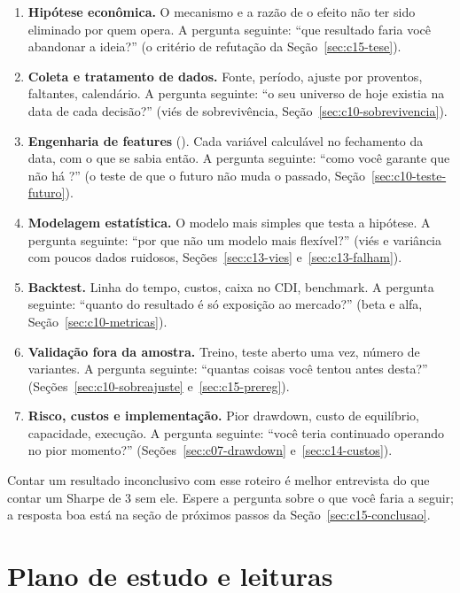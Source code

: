 \begin{enumerate}
  \item \textbf{Hipótese econômica.} O mecanismo e a razão de o efeito não ter sido eliminado por quem opera. A pergunta seguinte: ``que resultado faria você abandonar a ideia?'' (o critério de refutação da Seção~\ref{sec:c15-tese}).
  \item \textbf{Coleta e tratamento de dados.} Fonte, período, ajuste por proventos, faltantes, calendário. A pergunta seguinte: ``o seu universo de hoje existia na data de cada decisão?'' (viés de sobrevivência, Seção~\ref{sec:c10-sobrevivencia}).
  \item \textbf{Engenharia de features} (). Cada variável calculável no fechamento da data, com o que se sabia então. A pergunta seguinte: ``como você garante que não há ?'' (o teste de que o futuro não muda o passado, Seção~\ref{sec:c10-teste-futuro}).
  \item \textbf{Modelagem estatística.} O modelo mais simples que testa a hipótese. A pergunta seguinte: ``por que não um modelo mais flexível?'' (viés e variância com poucos dados ruidosos, Seções~\ref{sec:c13-vies} e~\ref{sec:c13-falham}).
  \item \textbf{Backtest.} Linha do tempo, custos, caixa no CDI, benchmark. A pergunta seguinte: ``quanto do resultado é só exposição ao mercado?'' (beta e alfa, Seção~\ref{sec:c10-metricas}).
  \item \textbf{Validação fora da amostra.} Treino, teste aberto uma vez, número de variantes. A pergunta seguinte: ``quantas coisas você tentou antes desta?'' (Seções~\ref{sec:c10-sobreajuste} e~\ref{sec:c15-prereg}).
  \item \textbf{Risco, custos e implementação.} Pior drawdown, custo de equilíbrio, capacidade, execução. A pergunta seguinte: ``você teria continuado operando no pior momento?'' (Seções~\ref{sec:c07-drawdown} e~\ref{sec:c14-custos}).
\end{enumerate}

Contar um resultado inconclusivo com esse roteiro é melhor entrevista do que contar um Sharpe de 3 sem ele. Espere a pergunta sobre o que você faria a seguir; a resposta boa está na seção de próximos passos da Seção~\ref{sec:c15-conclusao}.

\section{Plano de estudo e leituras}
\label{sec:c16-livros}

